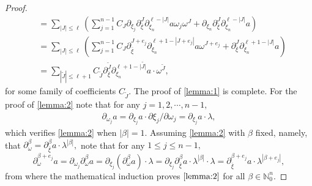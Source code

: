 \documentclass[12pt, reqno]{amsart}
\theoremstyle{definition}
\theoremstyle{remark}
\numberwithin{equation}{section}
\begin{document}
\begin{proof}
\begin{align*}
  &=\sum_{|J|\leq \ell }\left(\sum_{j=1}^{n-1}C_{J}\partial_{\xi_j}\partial_{\overline{\xi}}^{J}\partial_{\xi_n}^{\ell-|J|}a\omega_j\omega^{J}+\partial_{\xi_n}\partial_{\overline{\xi}}^{J}\partial_{\xi_n}^{\ell-|J|}a\right)\\
  &=\sum_{|J|\leq \ell }\left(\sum_{j=1}^{n-1}C_{J}\partial_{\overline{\xi}}^{J+e_j}\partial_{\xi_n}^{\ell+1-|J+e_j|}a\omega^{J+e_j}+\partial_{\overline{\xi}}^{J}\partial_{\xi_n}^{\ell+1-|J|}a\right)\\
  &=\sum_{|\tilde{J}|\leq \ell+1 }C_{\tilde{J}}\partial_{\overline{\xi}}^{\tilde{J}}\partial_{\xi_n}^{\ell+1-|\tilde{J|}}a\cdot \omega^{\tilde{J}},
\end{align*}for some family of coefficients $C_{\tilde{J}}.$ The proof of \eqref{lemma:1} is complete. For the proof of \eqref{lemma:2} note that for any $j=1,2,\cdots, n-1,$
\begin{align*}
    \partial_{\omega_j}a=\partial_{\xi_j}a\cdot \partial\xi_{j}/\partial \omega_{j}=\partial_{\xi_j}a\cdot \lambda,
\end{align*}which verifies \eqref{lemma:2} when $|\beta|=1.$ Assuming  \eqref{lemma:2} with $\beta$ fixed, namely, that $  \partial_\omega^{\beta}=\partial_{\overline{\xi}}^{\beta}a\cdot  \lambda^{|\beta|},$ note that for any $1\leq j\leq n-1,$
\begin{equation*}
     \partial_\omega^{\beta+e_j} a= \partial_{\omega_j}\partial_{\omega}^{\beta}a= \partial_{\xi_j}(\partial_{\omega}^{\beta}a)\cdot \lambda=\partial_{\xi_j}\partial_{\overline{\xi}}^{\beta}a\cdot  \lambda^{|\beta|}\cdot \lambda=\partial_{\overline{\xi}}^{\beta+e_j}a\cdot  \lambda^{|\beta+e_j|},
\end{equation*}from where the mathematical induction proves $ \eqref{lemma:2} $ for all $\beta\in \mathbb{N}_0^n.$
\end{proof}
\end{document}
